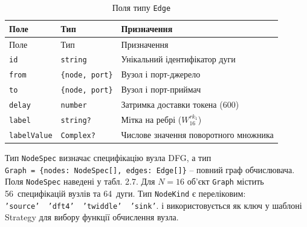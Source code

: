 \documentclass[
]{article}
\begin{document}
\begin{longtable}[]{@{}
  >{\raggedright\arraybackslash}p{}
  >{\raggedright\arraybackslash}p{}
  >{\raggedright\arraybackslash}p{}@{}}
\caption{Поля типу \protect\texttt{Edge}}\tabularnewline
\toprule\noalign{}
\begin{minipage}[b]{\linewidth}\raggedright
Поле
\end{minipage} & \begin{minipage}[b]{\linewidth}\raggedright
Тип
\end{minipage} & \begin{minipage}[b]{\linewidth}\raggedright
Призначення
\end{minipage} \\
\midrule\noalign{}
\endfirsthead
\toprule\noalign{}
\begin{minipage}[b]{\linewidth}\raggedright
Поле
\end{minipage} & \begin{minipage}[b]{\linewidth}\raggedright
Тип
\end{minipage} & \begin{minipage}[b]{\linewidth}\raggedright
Призначення
\end{minipage} \\
\midrule\noalign{}
\endhead
\bottomrule\noalign{}
\endlastfoot
\texttt{id} & \texttt{string} & Унікальний ідентифікатор дуги \\
\texttt{from} &
\texttt{\{}\texttt{node}\texttt{,\ }\texttt{port}\texttt{\}} & Вузол і
порт-джерело \\
\texttt{to} &
\texttt{\{}\texttt{node}\texttt{,\ }\texttt{port}\texttt{\}} & Вузол і
порт-приймач \\
\texttt{delay} & \texttt{number} & Затримка доставки токена (600) \\
\texttt{label} & \texttt{string}\texttt{?} & Мітка на ребрі
(\(W_{16}^{rk_{1}}\)) \\
\texttt{labelValue} & \texttt{Complex}\texttt{?} & Числове значення
поворотного множника \\
\end{longtable}

Тип \texttt{NodeSpec} визначає специфікацію вузла DFG, а тип
\texttt{Graph}\texttt{\ =\ \{}\texttt{nodes}\texttt{:\ }\texttt{NodeSpec}\texttt{{[}{]},\ }\texttt{edges}\texttt{:\ }\texttt{Edge}\texttt{{[}{]}\}}
-- повний граф обчислювача. Поля \texttt{NodeSpec} наведені у табл. 2.7.
Для \(N = 16\) об'єкт \texttt{Graph} містить 56~специфікацій вузлів та
64~дуги. Тип \texttt{NodeKind} є переліковим:
\texttt{’}\texttt{source}\texttt{’\ \textbar{}\ ’dft4’\ \textbar{}\ ’}\texttt{twiddle}\texttt{’\ \textbar{}\ ’}\texttt{sink}\texttt{’}.
і використовується як ключ у шаблоні Strategy для вибору функції
обчислення вузла.
\end{document}
